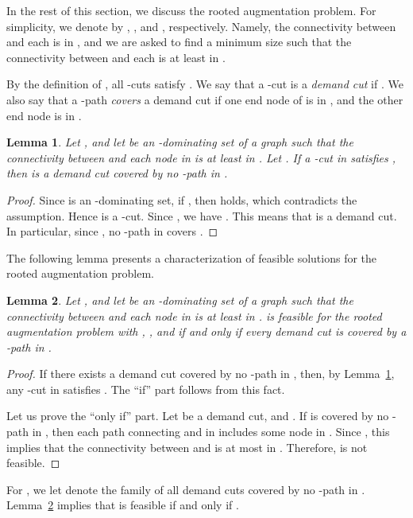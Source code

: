 \documentclass[11pt]{article}
\newtheorem{lemma}{Lemma}
\begin{document}
 In the rest of this section, we discuss the rooted augmentation
 problem.
 For simplicity,
 we denote  by , , and , respectively.
 Namely, the connectivity between  and each  is 
 in , and we are asked to find a minimum size 
 such that the connectivity between  and each  is at least  in
 .


 By the definition of ,
all -cuts  satisfy .
We say that a -cut  is a \emph{demand cut}
if .
We also say that a -path  \emph{covers} a demand cut 
if one end node of  is in , and the other end node is in
.

   \begin{lemma}\label{lem.Ucut}
    Let ,
    and let  be an -dominating set of a graph 
    such that the connectivity between  and each node in  is
    at least  in .
  Let .
  If a -cut  in  satisfies ,
  then  is a demand cut covered by no -path in .
 \end{lemma}
   \begin{proof}
    Since  is an -dominating set, if , 
   then  holds,
   which contradicts the assumption.
   Hence  is a -cut.
  Since ,
    we have .
    This means that  is a demand cut.
    In particular, since ,
    no -path in  covers .
   \end{proof}

   The following lemma presents a characterization of feasible solutions
   for the rooted augmentation problem.
    \begin{lemma}
     \label{lem.feasibility}
         Let ,
    and let  be an -dominating set of a graph 
    such that the connectivity between   and each node in  is at least
      in .
     is feasible for the rooted augmentation
    problem with , , and 
    if and only if every demand cut  is covered by a
    -path in .
    \end{lemma}
     \begin{proof}
      If there exists a demand cut  covered by no -path in ,
      then, by Lemma~\ref{lem.Ucut},
      any -cut  in  satisfies .
      The ``if'' part follows from this fact.

      Let us prove the ``only if'' part.
     Let  be a demand cut,
      and .
     If  is covered by 
     no -path in ,
     then each path connecting  and   in  
      includes some node in . Since ,
     this implies that the connectivity between  and  is at most
      in .  Therefore,  is not feasible.
     \end{proof}

  For ,
  we let  denote
  the family of all demand cuts
   covered by no -path in .
  Lemma~\ref{lem.feasibility} implies that  is feasible if and only if .
\end{document}
